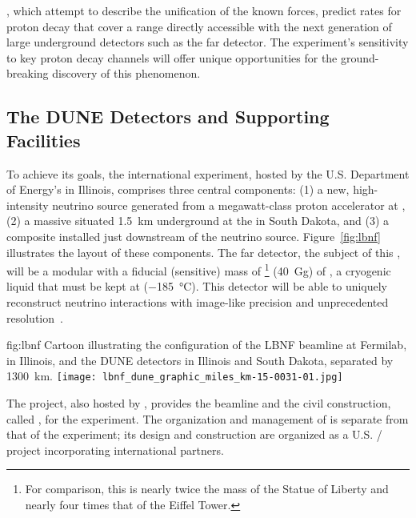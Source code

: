 , which attempt to describe the unification of the known forces, predict rates for proton decay that cover a range directly accessible with the next generation of large underground detectors such as the  far detector. The experiment's sensitivity to key proton decay channels will offer unique opportunities for the ground-breaking discovery of this phenomenon.

\subsection{The DUNE Detectors and Supporting Facilities}
\label{sec:exec-overall-det-sppt}


To achieve its goals, the international  experiment, hosted by the U.S. Department of Energy's  in Illinois, comprises three central components: (1) a new, high-intensity neutrino source generated from a megawatt-class proton accelerator at , (2)  a massive  situated \SI{1.5}{\km} underground at the  in South Dakota, and (3) a composite  installed just downstream of the neutrino source. 
Figure~\ref{fig:lbnf} illustrates the layout of these components. The far detector, the subject of this , will be a modular  
with a fiducial (sensitive) mass of
\fdfiducialmass{}\footnote{For comparison, this is nearly twice the mass of the Statue of Liberty and nearly four times that of the Eiffel Tower.} 
(\SI{40}{\giga\gram}) 
of , a cryogenic liquid that must be kept at \lartemp{} (\SI{-185}{\degree}C). This detector will be able to  uniquely reconstruct neutrino interactions with image-like precision and unprecedented resolution~\cite{Adams:2013qkq}. 

\begin{dunefigure}{fig:lbnf}{ 	
Cartoon illustrating the configuration of the LBNF beamline at Fermilab, in Illinois, and the DUNE detectors in Illinois and South Dakota, separated by \SI{1300}{km}.}
\texttt{[image: lbnf\_dune\_graphic\_miles\_km-15-0031-01.jpg]}
\end{dunefigure}



The  project, also hosted by , provides the beamline and the civil construction, called , for the  experiment.  
The organization and management of  is separate from that of the experiment; its design and construction are organized as a U.S. / project incorporating international partners. 

